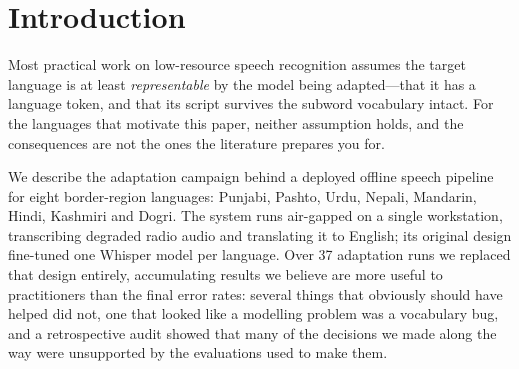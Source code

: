 \documentclass[sigconf,anonymous,review]{acmart}
\begin{document}


\maketitle

\section{Introduction}

Most practical work on low-resource speech recognition assumes the target
language is at least \emph{representable} by the model being adapted---that it
has a language token, and that its script survives the subword vocabulary
intact. For the languages that motivate this paper, neither assumption holds,
and the consequences are not the ones the literature prepares you for.

We describe the adaptation campaign behind a deployed offline speech pipeline
for eight border-region languages: Punjabi, Pashto, Urdu, Nepali, Mandarin,
Hindi, Kashmiri and Dogri. The system runs air-gapped on a single workstation,
transcribing degraded radio audio and translating it to English; its original
design fine-tuned one Whisper model per language. Over 37 adaptation runs we
replaced that design entirely, accumulating results we believe are more useful
to practitioners than the final error rates: several things that obviously
should have helped did not, one that looked like a modelling problem was a
vocabulary bug, and a retrospective audit showed that many of the decisions we
made along the way were unsupported by the evaluations used to make them.
\end{document}
